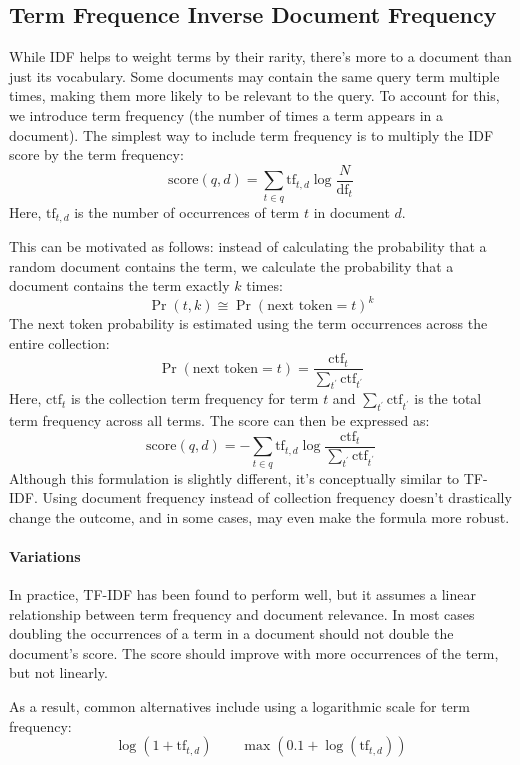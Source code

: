 \subsection{Term Frequence Inverse Document Frequency}
While IDF helps to weight terms by their rarity, there's more to a document than just its vocabulary. 
Some documents may contain the same query term multiple times, making them more likely to be relevant to the query. 
To account for this, we introduce term frequency (the number of times a term appears in a document). 
The simplest way to include term frequency is to multiply the IDF score by the term frequency:
\[\text{score}(q,d)=\sum_{t \in q}\text{tf}_{t,d}\log\dfrac{N}{\text{df}_t}\]
Here, $\text{tf}_{t,d}$ is the number of occurrences of term $t$ in document $d$.

This can be motivated as follows: instead of calculating the probability that a random document contains the term, we calculate the probability that a document contains the term exactly $k$ times:
\[\Pr(t,k) \cong  \Pr(\text{next token}=t)^k\]
\noindent The next token probability is estimated using the term occurrences across the entire collection:
\[\Pr(\text{next token} = t) = \frac{\text{ctf}_t}{\sum_{t^\prime}\text{ctf}_{t^{\prime}}}\]
Here, $\text{ctf}_t$ is the collection term frequency for term $t$ and $\sum_{t^\prime}\text{ctf}_{t^{\prime}}$ is the total term frequency across all terms. 
The score can then be expressed as:
\[\text{score}(q,d) = - \sum_{t\in q} \text{tf}_{t,d} \log\frac{\text{ctf}_t}{\sum_{t^\prime}\text{ctf}_{t^\prime}}\] 
\noindent Although this formulation is slightly different, it's conceptually similar to TF-IDF. 
Using document frequency instead of collection frequency doesn't drastically change the outcome, and in some cases, may even make the formula more robust.

\paragraph*{Variations}
In practice, TF-IDF has been found to perform well, but it assumes a linear relationship between term frequency and document relevance. 
In most cases doubling the occurrences of a term in a document should not double the document's score. 
The score should improve with more occurrences of the term, but not linearly.

As a result, common alternatives include using a logarithmic scale for term frequency:
\[\log(1+\text{tf}_{t,d}) \qquad \max(0.1+\log(\text{tf}_{t,d}))\]